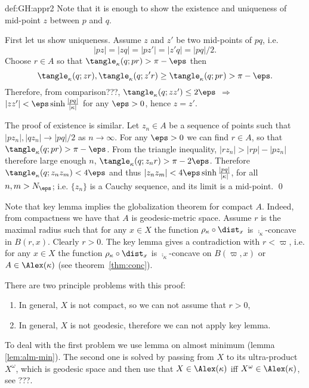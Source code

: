 {\begin{subthm}{def:GH:appr2}
Note that it is enough to show the existence and uniqueness of mid-point $z$ between $p$ and $q$.

First let us show uniqueness. 
Assume $z$ and $z'$ be two mid-points of $p q$, i.e. 
$$|p z|=|z q|=|p z'|=|z' q|=|p q|/2.$$
Choose $r\in A$ so that
$\tangle_{\kappa} (q;p r)>\pi-\eps$ then 
$$\tangle_{\kappa} (q;z r),\tangle_{\kappa} (q;z' r)\ge\tangle_{\kappa} (q;p r)>\pi-\eps.$$
Therefore, from comparison???, $\tangle_{\kappa} (q;z z')\le2\eps$ $\Rightarrow$ $|z z'|<\eps\sinh\tfrac{|p q|}{|\kappa|}$ for any $\eps>0$, hence $z=z'$.

The proof of existence is similar.
Let $z_n\in A$ be a sequence of points such that $|p z_n|,|q z_n|\to|p q|/2$ as $n\to\infty$.
For any $\eps>0$ we can find $r\in A$, so that $\tangle_\kappa (q;p r)>\pi-\eps$. 
From the triangle inequality,
$|r z_n|>|r p|-|p z_n|$ therefore large enough $n$, $\tangle_{\kappa}(q;z_n r)>\pi-2\eps$. 
Therefore $\tangle_{\kappa} (q;z_n z_m)<4\eps$ and thus $|z_n z_m|< 4\eps\sinh\tfrac{|p q|}{|\kappa|}$, for all $n,m>N_\eps$; i.e. $\{z_n\}$ is a Cauchy sequence, and its limit is a mid-point.
\qed













Note that key lemma implies the globalization theorem for compact $A$. 
Indeed, from compactness we have that $A$ is geodesic-metric space. 
Assume $r$ is the maximal radius such that for any $x\in X$ the function $\rho_\kappa\circ\dist_x$ is $\comp_\kappa$-concave in $B(r,x)$.
Clearly $r>0$.
The key lemma gives a contradiction with $r<\varpi$, i.e. for any $x\in X$ the function $\rho_\kappa\circ\dist_x$ is $\comp_\kappa$-concave on $B(\varpi,x)$ or $A\in\Alex(\kappa)$ (see theorem~\ref{thm:conc}).

There are two principle problems with this proof:
\begin{enumerate}
\item In general, $X$ is not compact, so we can not assume that $r>0$,
\item In general, $X$ is not geodesic, therefore we can not apply key lemma.
\end{enumerate}
To deal with the first problem we use lemma on almost minimum (lemma \ref{lem:alm-min}).
The second one is solved by passing from $X$ to its ultra-product $X^\omega$, which is geodesic space and then use that $X\in\Alex(\kappa)$ iff $X^\omega\in\Alex(\kappa)$, see ???.


\end{subthm}}
